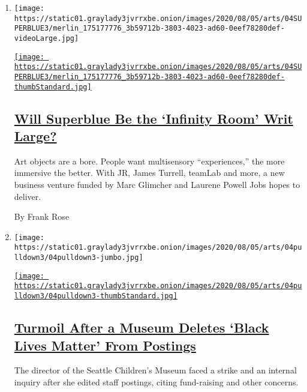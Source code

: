 \begin{enumerate}
\def\labelenumi{\arabic{enumi}.}
\item
  \texttt{[image: https://static01.graylady3jvrrxbe.onion/images/2020/08/05/arts/04SUPERBLUE3/merlin\_175177776\_3b59712b-3803-4023-ad60-0eef78280def-videoLarge.jpg]}

  \href{/2020/08/04/arts/superblue-immersive-art-pace-jobs.html}{\texttt{[image: https://static01.graylady3jvrrxbe.onion/images/2020/08/05/arts/04SUPERBLUE3/merlin\_175177776\_3b59712b-3803-4023-ad60-0eef78280def-thumbStandard.jpg]}}

  \hypertarget{will-superblue-be-the-infinity-room-writ-large}{%
  \subsection{\texorpdfstring{\href{/2020/08/04/arts/superblue-immersive-art-pace-jobs.html}{Will
  Superblue Be the `Infinity Room' Writ
  Large?}}{Will Superblue Be the `Infinity Room' Writ Large?}}\label{will-superblue-be-the-infinity-room-writ-large}}

  Art objects are a bore. People want multisensory ``experiences,'' the
  more immersive the better. With JR, James Turrell, teamLab and more, a
  new business venture funded by Marc Glimcher and Laurene Powell Jobs
  hopes to deliver.

  By Frank Rose
\item
  \texttt{[image: https://static01.graylady3jvrrxbe.onion/images/2020/08/05/arts/04pulldown3/04pulldown3-jumbo.jpg]}

  \href{/2020/08/04/arts/design/seattle-childrens-museum.html}{\texttt{[image: https://static01.graylady3jvrrxbe.onion/images/2020/08/05/arts/04pulldown3/04pulldown3-thumbStandard.jpg]}}

  \hypertarget{turmoil-after-a-museum-deletes-black-lives-matter-from-postings}{%
  \subsection{\texorpdfstring{\href{/2020/08/04/arts/design/seattle-childrens-museum.html}{Turmoil
  After a Museum Deletes `Black Lives Matter' From
  Postings}}{Turmoil After a Museum Deletes `Black Lives Matter' From Postings}}\label{turmoil-after-a-museum-deletes-black-lives-matter-from-postings}}

  The director of the Seattle Children's Museum faced a strike and an
  internal inquiry after she edited staff postings, citing fund-raising
  and other concerns.


\end{enumerate}
